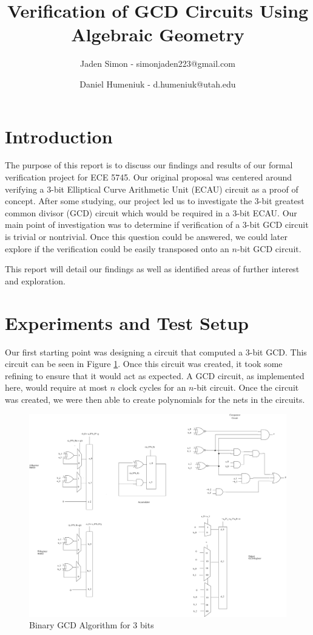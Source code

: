 \documentclass[12pt]{report}
\title{Verification of GCD Circuits Using Algebraic Geometry}
\author{Jaden Simon - simonjaden223@gmail.com \\ \and
	   Daniel Humeniuk - d.humeniuk@utah.edu}
\begin{document}
\maketitle

\section{Introduction}

The purpose of this report is to discuss our findings and results of our formal verification project for ECE 5745. Our original proposal was centered around verifying a 3-bit Elliptical Curve Arithmetic Unit (ECAU) circuit as a proof of concept. After some studying, our project led us to investigate the 3-bit greatest common divisor (GCD) circuit which would be required in a 3-bit ECAU. Our main point of investigation was to determine if verification of a 3-bit GCD circuit is trivial or nontrivial. Once this question could be answered, we could later explore if the verification could be easily transposed onto an $n$-bit GCD circuit.

This report will detail our findings as well as identified areas of further interest and exploration.

\section{Experiments and Test Setup}

Our first starting point was designing a circuit that computed a 3-bit GCD. This circuit can be seen in Figure \ref{fig:gcd}. Once this circuit was created, it took some refining to ensure that it would act as expected. A GCD circuit, as implemented here, would require at most $n$ clock cycles for an $n$-bit circuit. Once the circuit was created, we were then able to create polynomials for the nets in the circuits.

\begin{figure}
\includegraphics[scale=0.35]{images/gcd_page.png}
\caption{Binary GCD Algorithm for $3$ bits}
\label{fig:gcd}
\end{figure}
\end{document}
